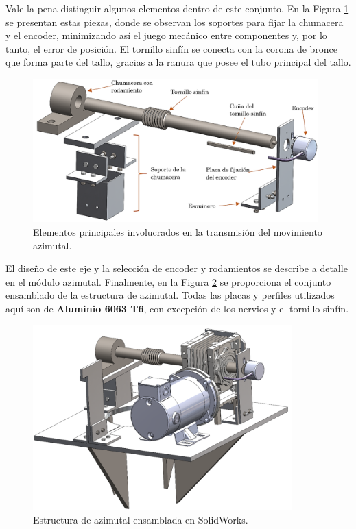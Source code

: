 Vale la pena distinguir algunos elementos dentro de este conjunto. En la Figura \ref{fig:azi4} se presentan estas piezas, donde se observan los soportes para fijar la chumacera y el encoder, minimizando así el juego mecánico entre componentes y, por lo tanto, el error de posición. El tornillo sinfín se conecta con la corona de bronce que forma parte del tallo, gracias a la ranura que posee el tubo principal del tallo.
\begin{figure}[H]
	\centering
	\includegraphics[width=11cm]{imagenes/azi4}
	\caption{Elementos principales involucrados en la transmisión del movimiento azimutal.}
	\label{fig:azi4}
\end{figure}

El diseño de este eje y la selección de encoder y rodamientos se describe a detalle en el módulo azimutal. Finalmente, en la Figura \ref{fig:azi5} se proporciona el conjunto ensamblado de la estructura de azimutal. Todas las placas y perfiles utilizados aquí son de \textbf{Aluminio 6063 T6}, con excepción de los nervios y el tornillo sinfín.

\begin{figure}[H]
	\centering
	\includegraphics[width=10cm]{imagenes/azi5}
	\caption{Estructura de azimutal ensamblada en SolidWorks.}
	\label{fig:azi5}
\end{figure}

